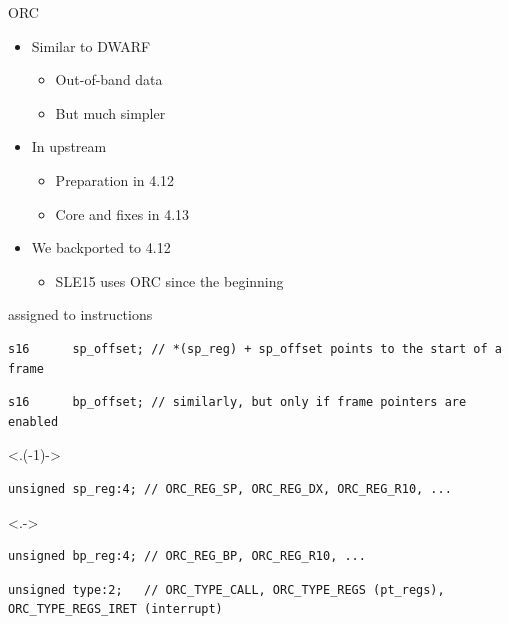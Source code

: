 \begin{frame}[fragile]{ORC}

  \begin{itemize}[<+->]
    \item Similar to DWARF
    \begin{itemize}[<+->]
      \setcounter{mybeamerpauses}{\value{beamerpauses}}
      \item Out-of-band data
      \addtocounter{beamerpauses}{2}
      \item But much simpler
    \end{itemize}

    \item In upstream
    \begin{itemize}[<+->]
      \item Preparation in 4.12
      \item Core and fixes in 4.13
    \end{itemize}

    \item We backported to 4.12
    \begin{itemize}[<+->]
      \item SLE15 uses ORC since the beginning
    \end{itemize}

  \end{itemize}

  \setcounter{beamerpauses}{\value{mybeamerpauses}}
  \onslide<+->

  \begin{block}{ assigned to instructions}
    \begin{lstlisting}[aboveskip=2pt,belowskip=0pt]
s16      sp_offset; // *(sp_reg) + sp_offset points to the start of a frame
    \end{lstlisting}
    \onslide<+->
    \begin{lstlisting}[aboveskip=0pt,belowskip=0pt]
s16      bp_offset; // similarly, but only if frame pointers are enabled
    \end{lstlisting}
    \onslide<.(-1)->
    \begin{lstlisting}[aboveskip=0pt,belowskip=0pt]
unsigned sp_reg:4; // ORC_REG_SP, ORC_REG_DX, ORC_REG_R10, ...
    \end{lstlisting}
    \onslide<.->
    \begin{lstlisting}[aboveskip=0pt,belowskip=0pt]
unsigned bp_reg:4; // ORC_REG_BP, ORC_REG_R10, ...
    \end{lstlisting}
    \onslide<+->
    \begin{lstlisting}[aboveskip=0pt,belowskip=2pt]
unsigned type:2;   // ORC_TYPE_CALL, ORC_TYPE_REGS (pt_regs), ORC_TYPE_REGS_IRET (interrupt)
    \end{lstlisting}
  \end{block}

\end{frame}

